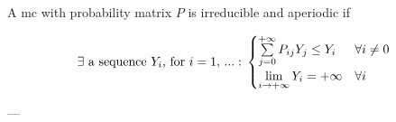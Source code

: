 	\begin{theorem}[4.2, KT p. 95]
		A \gls{mc} with probability matrix $P$ is irreducible and aperiodic if

		\begin{equation}\noindent%
			\exists \text{ a sequence } Y_i \text{, for } i = 1,\,... :\\
			\begin{cases}
 				\sum\limits_{j=0}^{+\infty} P_{ij} Y_j \le Y_i 	& \forall i \neq 0 \\
 				\lim\limits_{i \to +\infty} Y_i = +\infty		& \forall i
			\end{cases}
	\end{equation}
	\end{theorem}
	---
